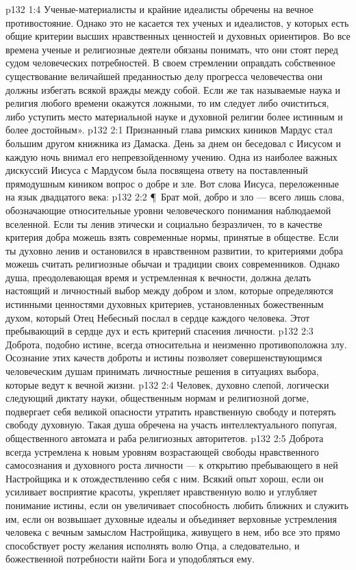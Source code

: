 \vs p132 1:4 Ученые\hyp{}материалисты и крайние идеалисты обречены на вечное противостояние. Однако это не касается тех ученых и идеалистов, у которых есть общие критерии высших нравственных ценностей и духовных ориентиров. Во все времена ученые и религиозные деятели обязаны понимать, что они стоят перед судом человеческих потребностей. В своем стремлении оправдать собственное существование величайшей преданностью делу прогресса человечества они должны избегать всякой вражды между собой. Если же так называемые наука и религия любого времени окажутся ложными, то им следует либо очиститься, либо уступить место материальной науке и духовной религии более истинным и более достойным».
\vs p132 2:1 Признанный глава римских киников Мардус стал большим другом книжника из Дамаска. День за днем он беседовал с Иисусом и каждую ночь внимал его непревзойденному учению. Одна из наиболее важных дискуссий Иисуса с Мардусом была посвящена ответу на поставленный прямодушным киником вопрос о добре и зле. Вот слова Иисуса, переложенные на язык двадцатого века:
\vs p132 2:2 \P\ Брат мой, добро и зло --- всего лишь слова, обозначающие относительные уровни человеческого понимания наблюдаемой вселенной. Если ты ленив этически и социально безразличен, то в качестве критерия добра можешь взять современные нормы, принятые в обществе. Если ты духовно ленив и остановился в нравственном развитии, то критериями добра можешь считать религиозные обычаи и традиции своих современников. Однако душа, преодолевающая время и устремленная к вечности, должна делать настоящий и личностный выбор между добром и злом, которые определяются истинными ценностями духовных критериев, установленных божественным духом, который Отец Небесный послал в сердце каждого человека. Этот пребывающий в сердце дух и есть критерий спасения личности.
\vs p132 2:3 Доброта, подобно истине, всегда относительна и неизменно противоположна злу. Осознание этих качеств доброты и истины позволяет совершенствующимся человеческим душам принимать личностные решения в ситуациях выбора, которые ведут к вечной жизни.
\vs p132 2:4 Человек, духовно слепой, логически следующий диктату науки, общественным нормам и религиозной догме, подвергает себя великой опасности утратить нравственную свободу и потерять свободу духовную. Такая душа обречена на участь интеллектуального попугая, общественного автомата и раба религиозных авторитетов.
\vs p132 2:5 Доброта всегда устремлена к новым уровням возрастающей свободы нравственного самосознания и духовного роста личности --- к открытию пребывающего в ней Настройщика и к отождествлению себя с ним. Всякий опыт хорош, если он усиливает восприятие красоты, укрепляет нравственную волю и углубляет понимание истины, если он увеличивает способность любить ближних и служить им, если он возвышает духовные идеалы и объединяет верховные устремления человека с вечным замыслом Настройщика, живущего в нем, ибо все это прямо способствует росту желания исполнять волю Отца, а следовательно, и божественной потребности найти Бога и уподобляться ему.
